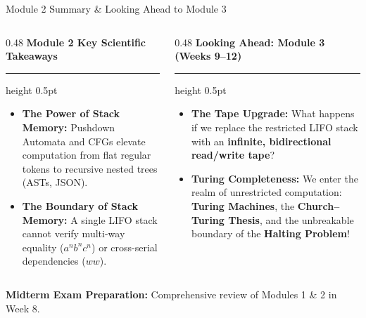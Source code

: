 \documentclass[aspectratio=169, 10pt]{beamer}
\newcommand{\colheader}[1]{%
  {\noindent\footnotesize\bfseries\color{gimpanavy}#1}%
  \vspace{0.03cm}%
  {\color{gimpanavy!30}\hrule height 0.5pt}%
  \vspace{0.08cm}%
}
\begin{document}
\begin{frame}{Module 2 Summary \& Looking Ahead to Module 3}
  \begin{columns}[T]
    \begin{column}{0.48\textwidth}
      \colheader{Module 2 Key Scientific Takeaways}
      \begin{tcolorbox}[conceptcard, top=3pt, bottom=3pt]
        \begin{itemize}\setlength{\itemsep}{2.5pt}\footnotesize
          \item \textbf{The Power of Stack Memory:} Pushdown Automata and CFGs elevate computation from flat regular tokens to recursive nested trees (ASTs, JSON).
          \item \textbf{The Boundary of Stack Memory:} A single LIFO stack cannot verify multi-way equality ($a^n b^n c^n$) or cross-serial dependencies ($ww$).
        \end{itemize}
      \end{tcolorbox}
    \end{column}

    \hfill

    \begin{column}{0.48\textwidth}
      \colheader{Looking Ahead: Module 3 (Weeks 9--12)}
      \begin{tcolorbox}[spotlightcard, top=3pt, bottom=3pt]
        \begin{itemize}\setlength{\itemsep}{2.5pt}\footnotesize
          \item \textbf{The Tape Upgrade:} What happens if we replace the restricted LIFO stack with an \textbf{infinite, bidirectional read/write tape}?
          \item \textbf{Turing Completeness:} We enter the realm of unrestricted computation: \textbf{Turing Machines}, the \textbf{Church--Turing Thesis}, and the unbreakable boundary of the \textbf{Halting Problem}!
        \end{itemize}
      \end{tcolorbox}
    \end{column}
  \end{columns}

  \vspace{0.15cm}
  \begin{center}
    {\footnotesize\color{gimpanavy}\textbf{Midterm Exam Preparation:} Comprehensive review of Modules 1 \& 2 in Week 8.}
  \end{center}
\end{frame}
\end{document}
